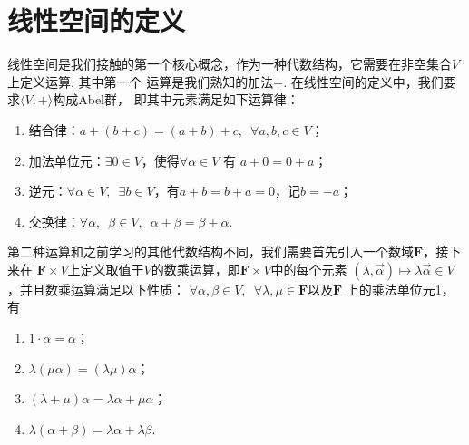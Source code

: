 \section{线性空间的定义}
线性空间是我们接触的第一个核心概念，作为一种代数结构，它需要在非空集合$V$上定义运算. 其中第一个
运算是我们熟知的加法$+$. 在线性空间的定义中，我们要求$\langle V:+\rangle$构成Abel群，
即其中元素满足如下运算律：
\begin{enumerate}
    \item 结合律：$a+(b+c)=(a+b)+c,\enspace\forall a,b,c\in V$；

    \item 加法单位元：$\exists 0 \in V$，使得$\forall\alpha\in V$ 有 $a+0=0+a$；

    \item 逆元：$\forall\alpha\in V,\enspace \exists b\in V$，有$a+b=b+a=0$，记$b=-a$；

    \item 交换律：$\forall\alpha,\enspace \beta\in V,\enspace \alpha+\beta=\beta+\alpha$.
\end{enumerate}

第二种运算和之前学习的其他代数结构不同，我们需要首先引入一个数域$\mathbf{F}$，接下来在
$\mathbf{F}\times V$上定义取值于$V$的数乘运算，即$\mathbf{F}\times V$中的每个元素
$(\lambda,\vec{\alpha})\mapsto \lambda\vec{\alpha}\in V$，并且数乘运算满足以下性质：
$\forall \alpha,\beta \in V,\enspace\forall \lambda,\mu\in\mathbf{F}$以及$\mathbf{F}$
上的乘法单位元1，有
\begin{enumerate}
    \item $1\cdot \alpha=\alpha$；

    \item $\lambda(\mu\alpha)=(\lambda\mu)\alpha$；

    \item $(\lambda+\mu)\alpha=\lambda\alpha+\mu\alpha$；

    \item $\lambda(\alpha+\beta)=\lambda\alpha+\lambda\beta$.
\end{enumerate}

